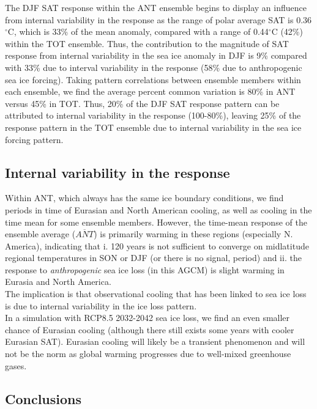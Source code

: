 \documentclass[twocol]{ametsoc}
\begin{document}
The DJF SAT response within the ANT ensemble begins to display an influence from internal variability in the response as the range of polar average SAT is 0.36$^\circ$C, which is 33\% of the mean anomaly, compared with a range of 0.44$^\circ$C (42\%) within the TOT ensemble. Thus, the contribution to the magnitude of SAT response from internal variability in the sea ice anomaly in DJF is 9\% compared with 33\% due to interval variability in the response (58\% due to anthropogenic sea ice forcing). Taking pattern correlations between ensemble members within each ensemble, we find the average percent common variation is 80\% in ANT versus 45\% in TOT. Thus, 20\% of the DJF SAT response pattern can be attributed to internal variability in the response (100-80\%), leaving 25\% of the response pattern in the TOT ensemble due to internal variability in the sea ice forcing pattern.

\subsection{Internal variability in the response}

Within ANT, which always has the same ice boundary conditions, we find periods in time of Eurasian and North American cooling, as well as cooling in the time mean for some ensemble members. However, the time-mean response of the ensemble average ($\overline{ANT}$) is primarily warming in these regions (especially N. America), indicating that i. 120 years is not sufficient to converge on midlatitude regional temperatures in SON or DJF (or there is no signal, period) and ii. the response to \textit{anthropogenic} sea ice loss (in this AGCM) is slight warming in Eurasia and North America. \\
The implication is that observational cooling that has been linked to sea ice loss is due to internal variability in the ice loss pattern. \\

In a simulation with RCP8.5 2032-2042 sea ice loss, we find an even smaller chance of Eurasian cooling (although there still exists some years with cooler Eurasian SAT). Eurasian cooling will likely be a transient phenomenon and will not be the norm as global warming progresses due to well-mixed greenhouse gases. %

\subsection{Conclusions}
\end{document}
